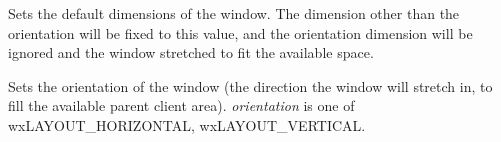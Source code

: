 \label{wxsashlayoutwindowsetdefaultsize}


Sets the default dimensions of the window. The dimension other than the orientation will be fixed to this
value, and the orientation dimension will be ignored and the window stretched to fit the available space.

\label{wxsashlayoutwindowsetorientation}


Sets the orientation of the window (the direction the window will stretch in, to fill the available
parent client area). {\it orientation} is one of wxLAYOUT\_HORIZONTAL, wxLAYOUT\_VERTICAL.



